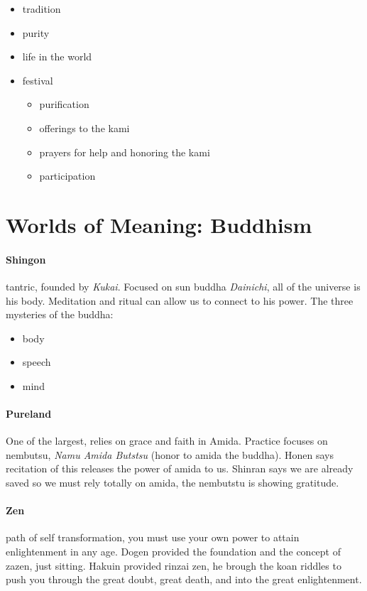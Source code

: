\documentclass{article}
\begin{document}
\begin{itemize}
	\item tradition
	\item purity
	\item life in the world
	\item festival
	\begin{itemize}
		\item purification
		\item offerings to the kami
		\item prayers for help and honoring the kami
		\item participation
	\end{itemize}
\end{itemize}

\section*{Worlds of Meaning: Buddhism}
\label{sec:worlds_of_meaning_buddhism}
\paragraph{Shingon}
\label{par:shingon}
tantric, founded by \emph{Kukai}. Focused on sun buddha \emph{Dainichi}, all of the universe is his body. Meditation and ritual can allow us to connect to his power. The three mysteries of the buddha:
\begin{itemize}
	\item body
	\item speech
	\item mind
\end{itemize}

\paragraph{Pureland}
\label{par:pureland}
One of the largest, relies on grace and faith in Amida. Practice focuses on nembutsu, \emph{Namu Amida Butstsu} (honor to amida the buddha). Honen says recitation of this releases the power of amida to us. Shinran says we are already saved so we must rely totally on amida, the nembutstu is showing gratitude.

\paragraph{Zen}
 \label{par:zen}
path of self transformation, you must use your own power to attain enlightenment in any age. Dogen provided the foundation and the concept of zazen, just sitting. Hakuin provided rinzai zen, he brough the koan riddles to push you through the great doubt, great death, and into the great enlightenment.
\end{document}
